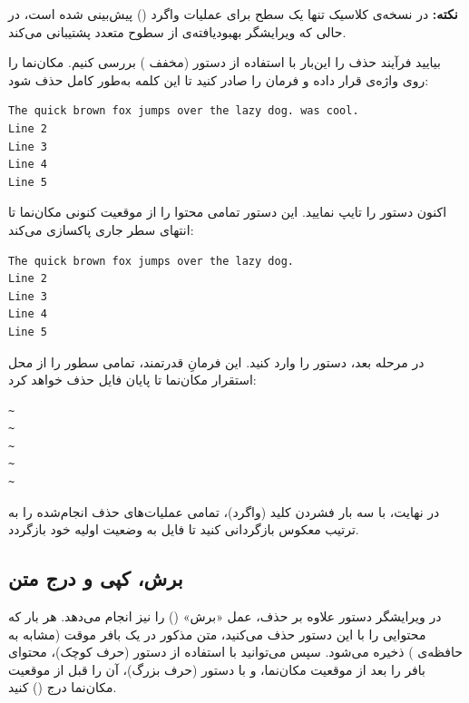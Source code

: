 \begin{note}
\textbf{نکته:} در نسخه‌ی کلاسیک  تنها یک سطح برای عملیات واگرد () پیش‌بینی شده است، در حالی که ویرایشگر بهبودیافته‌ی  از سطوح متعدد  پشتیبانی می‌کند.
\end{note}

بیایید فرآیند حذف را این‌بار با استفاده از دستور  (مخفف ) بررسی کنیم. مکان‌نما را روی واژه‌ی  قرار داده و فرمان  را صادر کنید تا این کلمه به‌طور کامل حذف شود:

\begin{latin}
\begin{lstlisting}
The quick brown fox jumps over the lazy dog. was cool.
Line 2
Line 3
Line 4
Line 5
\end{lstlisting}
\end{latin}

اکنون دستور  را تایپ نمایید. این دستور تمامی محتوا را از موقعیت کنونی مکان‌نما تا انتهای سطر جاری پاکسازی می‌کند:

\begin{latin}
\begin{lstlisting}
The quick brown fox jumps over the lazy dog.
Line 2
Line 3
Line 4
Line 5
\end{lstlisting}
\end{latin}

در مرحله بعد، دستور  را وارد کنید. این فرمانِ قدرتمند، تمامی سطور را از محل استقرار مکان‌نما تا پایان فایل حذف خواهد کرد:

\begin{latin}
\begin{lstlisting}
~
~
~
~
~
\end{lstlisting}
\end{latin}

در نهایت، با سه بار فشردن کلید  (واگرد)، تمامی عملیات‌های حذف انجام‌شده را به ترتیب معکوس بازگردانی کنید تا فایل به وضعیت اولیه خود بازگردد.

\subsection{برش، کپی و درج متن}

در ویرایشگر  دستور  علاوه بر حذف، عمل «برش» () را نیز انجام می‌دهد. هر بار که محتوایی را با این دستور حذف می‌کنید، متن مذکور در یک بافر موقت (مشابه به حافظه‌ی ) ذخیره می‌شود. سپس می‌توانید با استفاده از دستور  (حرف کوچک)، محتوای بافر را بعد از موقعیت مکان‌نما، و با دستور  (حرف بزرگ)، آن را قبل از موقعیت مکان‌نما درج () کنید.

